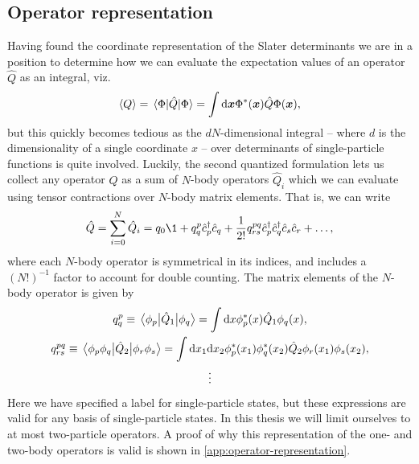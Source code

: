         \subsection{Operator representation}
            Having found the coordinate representation of the Slater
            determinants we are in a position to determine how we can evaluate
            the expectation values of an operator $\hat{Q}$ as an integral, viz.
            \begin{align}
                \expval{Q}
                = \mel{\Phi}{\hat{Q}}{\Phi}
                = \int\dd\boldsymbol{x}\Phi^{*}(\boldsymbol{x})\hat{Q}\Phi(\boldsymbol{x}),
            \end{align}
            but this quickly becomes tedious as the $dN$-dimensional integral --
            where $d$ is the dimensionality of a single coordinate $x$ -- over
            determinants of single-particle functions is quite involved.
            Luckily, the second quantized formulation lets us collect any
            operator $\hat{Q}$ as a sum of $N$-body operators $\hat{Q}_i$ which
            we can evaluate using tensor contractions over $N$-body matrix
            elements.
            That is, we can write
            \begin{align}
                \hat{Q}
                = \sum_{i = 0}^{N}
                \hat{Q}_i
                = q_0\1
                + q^{p}_{q}\ccr{p}\can{q}
                + \frac{1}{2!}
                q^{pq}_{rs}\ccr{p}\ccr{q}\can{s}\can{r}
                + \dots,
                \label{eq:many-body-operator}
            \end{align}
            where each $N$-body operator is symmetrical in its indices, and includes
            a $(N!)^{-1}$ factor to account for double counting.
            The matrix elements of the $N$-body operator is given by
            \begin{gather}
                q^{p}_{q}
                \equiv
                \mel{\phi_p}{\hat{Q}_1}{\phi_q}
                = \int\dd x \phi^{*}_{p}(x)\hat{Q}_1\phi_q(x),
                \\
                q^{pq}_{rs}
                \equiv
                \mel{\phi_p\phi_q}{\hat{Q}_2}{\phi_r\phi_s}
                =
                \int\dd x_1\dd x_2
                \phi^{*}_{p}(x_1)\phi^{*}_{q}(x_2)
                \hat{Q}_2
                \phi_r(x_1)
                \phi_s(x_2),
                \\
                \vdots
            \end{gather}
            Here we have specified a label for single-particle states, but
            these expressions are valid for any basis of single-particle states.
            In this thesis we will limit ourselves to at most two-particle
            operators.
            A proof of why this representation of the one- and two-body
            operators is valid is shown in
            \autoref{app:operator-representation}.

